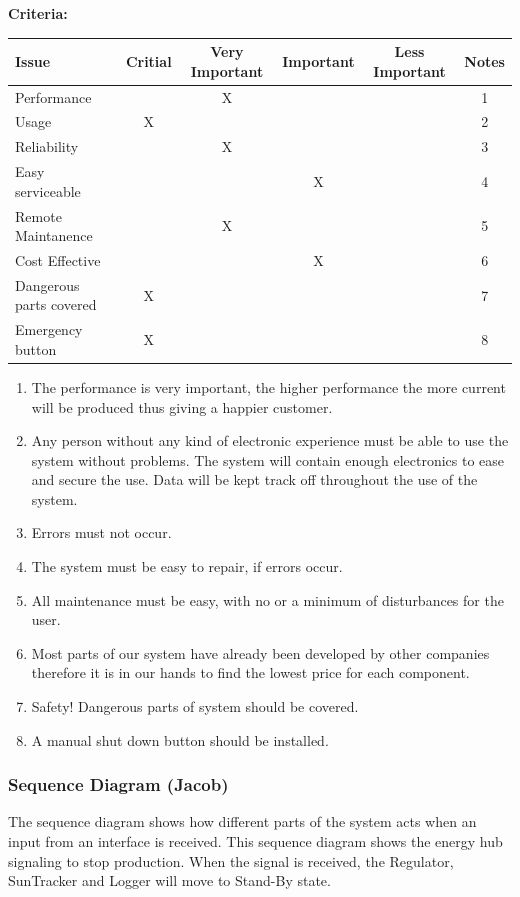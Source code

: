 \documentclass[12pt,a4paper]{report}
\begin{document}
\textbf{Criteria:}\\
\begin{tabular}{|l|c|c|c|c|c|}
\hline \textbf{Issue} & \textbf{Critial} & \textbf{Very Important} & \textbf{Important} & \textbf{Less Important} & \textbf{Notes} \\ 
\hline Performance &  & X &  &  & 1 \\ 
\hline Usage & X &  &  &  & 2 \\ 
\hline Reliability &  & X &  &  & 3 \\ 
\hline Easy serviceable &  &  & X &  & 4 \\ 
\hline Remote Maintanence &  & X &  &  & 5 \\
\hline Cost Effective &  &  & X &  & 6 \\
\hline Dangerous parts covered & X &  &  &  & 7 \\
\hline Emergency button & X &  &  &  & 8 \\
\hline 
\end{tabular}


\begin{enumerate}
\item The performance is very important, the higher performance the more current will be produced thus giving a happier customer.
\item Any person without any kind of electronic experience must be able to use the system without problems. The system will contain enough electronics to ease and secure the use. Data will be kept track off throughout the use of the system.
\item Errors must not occur.
\item The system must be easy to repair, if errors occur.
\item All maintenance must be easy, with no or a minimum of disturbances for the user.
\item Most parts of our system have already been developed by other companies therefore it is in our hands to find the lowest price for each component.
\item Safety! Dangerous parts of system should be covered.
\item A manual shut down button should be installed.
\end{enumerate}

\subsubsection{Sequence Diagram (Jacob)}
The sequence diagram shows how different parts of the system acts when an input from an interface is received. This sequence diagram shows the energy hub signaling to stop production. When the signal is received, the Regulator, SunTracker and Logger will move to Stand-By state.
\end{document}
